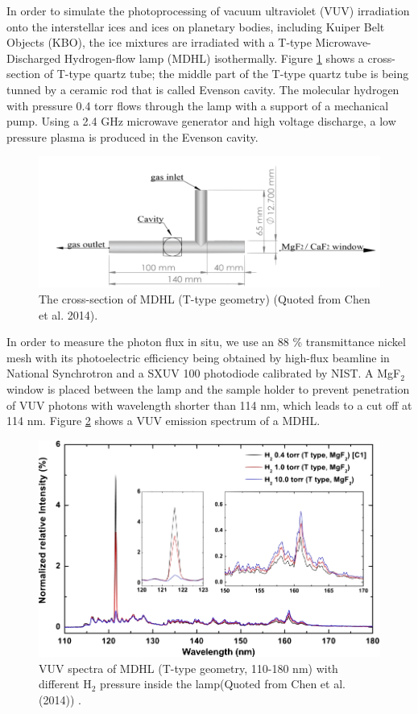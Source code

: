 In order to simulate the photoprocessing of vacuum ultraviolet (VUV) irradiation onto the interstellar ices and ices on planetary bodies, including Kuiper Belt Objects (KBO), the ice mixtures are irradiated with a T-type Microwave-Discharged Hydrogen-flow lamp (MDHL) isothermally. Figure \ref{fig:T_type} shows a cross-section of T-type quartz tube; the middle part of the T-type quartz tube is being tunned by a ceramic rod that is called Evenson cavity. The molecular hydrogen with pressure 0.4 torr flows through the lamp with a support of a mechanical pump. Using a 2.4 GHz microwave generator and high voltage discharge, a low pressure plasma is produced in the Evenson cavity.
\begin{figure}
\centering
\includegraphics[width=\textwidth]{figures/chapter2/T_type.png}
\caption{The cross-section of MDHL (T-type geometry) (Quoted from Chen et al. 2014).}
\label{fig:T_type}
\end{figure}
In order to measure the photon flux in situ, we use an 88 \% transmittance nickel mesh with its photoelectric efficiency being obtained by high-flux beamline in National Synchrotron and a SXUV 100 photodiode calibrated by NIST. A MgF$_2$ window is placed between the lamp and the sample holder to prevent penetration of VUV photons with wavelength shorter than 114 nm, which leads to a cut off at 114 nm. Figure \ref{fig:MDHL} shows a VUV emission spectrum of a MDHL.
\begin{figure}
\centering
\includegraphics[width=\textwidth]{figures/chapter2/MDHL.png}
\caption{VUV spectra of MDHL (T-type geometry, 110-180 nm) with different H$_2$ pressure inside the lamp(Quoted from Chen et al. (2014)\cite{chen2013vacuum}) .}
\label{fig:MDHL}
\end{figure}
